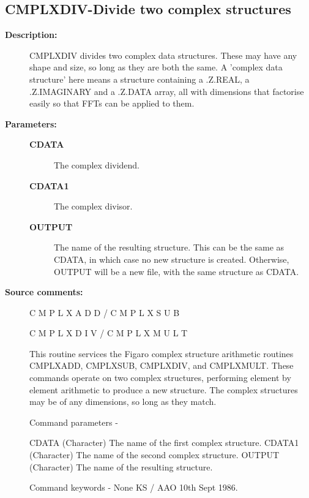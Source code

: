 \subsection{CMPLXDIV-\label{CMPLXDIV}Divide two complex structures}
\begin{description}

\item [\textbf{Description:}]
 CMPLXDIV  divides  two complex  data  structures.  These  may
 have any shape and size, so long as they are both the same.  A
 'complex data structure' here means a structure containing a
 .Z.REAL, a .Z.IMAGINARY and a .Z.DATA array, all with dimensions
 that factorise easily so that FFTs can be applied to them.

\item [\textbf{Parameters:}]
\begin{description}
\item [\textbf{CDATA}]
 The complex dividend.
\item [\textbf{CDATA1}]
 The complex divisor.
\item [\textbf{OUTPUT}]
 The name of the resulting structure. This can
 be the same as CDATA, in which case no new structure is
 created.  Otherwise, OUTPUT will be a new file, with the
 same structure as CDATA.
\end{description}

\item [\textbf{Source comments:}]
\begin{terminalv}
 C M P L X A D D   /   C M P L X S U B

 C M P L X D I V   /   C M P L X M U L T

 This routine services the Figaro complex structure arithmetic
 routines CMPLXADD, CMPLXSUB, CMPLXDIV, and CMPLXMULT.  These
 commands operate on two complex structures, performing element
 by element arithmetic to produce a new structure.  The complex
 structures may be of any dimensions, so long as they match.

 Command parameters -

 CDATA    (Character) The name of the first complex structure.
 CDATA1   (Character) The name of the second complex structure.
 OUTPUT   (Character) The name of the resulting structure.

 Command keywords - None
                                     KS / AAO  10th Sept 1986.
\end{terminalv}
\end{description}

